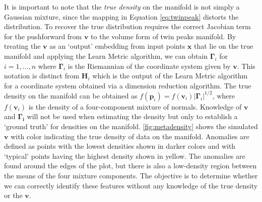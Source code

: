 \documentclass[12pt]{article}
\begin{document}
It is important to note that the \emph{true density} on the manifold is not simply a Gaussian mixture, since the mapping in Equation \eqref{eq:twinpeak} distorts the distribution. To recover the true distribution requires the correct Jacobian term for the pushforward from \(\bm{v}\) to the volume form of twin peaks manifold. By treating the \(\bm{v}\) as an `output' embedding from input points \(\bm{x}\) that lie on the true manifold and applying the Learn Metric algorithm, we can obtain \(\bm{\Gamma}_i\) for \(i=1,\dots,n\) where \(\bm{\Gamma}_i\) is the Riemannian of the coordinate system given by \(\bm{v}\). This notation is distinct from \(\bm{H}_i\) which is the output of the Learn Metric algorithm for a coordinate system obtained via a dimension reduction algorithm. The true density on the manifold can be obtained as \(f(\bm{p}_i)=f(\bm{v}_i)|\bm{\Gamma}_i|^{1/2}\), where \(f(\bm{v}_i)\) is the density of a four-component mixture of normals. Knowledge of \(\bm{v}\) and \(\bm{\Gamma_i}\) will not be used when estimating the density but only to establish a `ground truth' for densities on the manifold. \autoref{fig:metadensity} shows the simulated \(\bm{v}\) with color indicating the true density of data on the manifold. Anomalies are defined as points with the lowest densities shown in darker colors and with `typical' points having the highest density shown in yellow. The anomalies are found around the edges of the plot, but there is also a low-density region between the means of the four mixture components. The objective is to determine whether we can correctly identify these features without any knowledge of the true density or the \(\bm{v}\).
\end{document}
